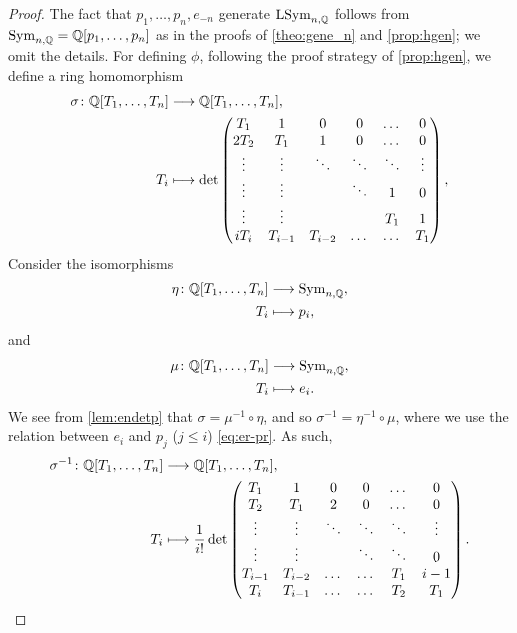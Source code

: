 \documentclass[11pt]{amsart}
\begin{document}
\begin{proof}
    The fact that \(p_1,\dots,p_n,e_{-n}\) generate \(\mathrm{LSym}_{n,\mathbb{Q}}\) follows from \(\mathrm{Sym}_{n,\mathbb{Q}} = \mathbb{Q}[p_1,\dots,p_n]\) as in the proofs of \cref{theo:gene_n} and \cref{prop:hgen}; we omit the details. For defining \(\phi\), following the proof strategy of \cref{prop:hgen}, we define a ring homomorphism
    \begin{align*}
        \sigma \colon \mathbb{Q} [T_1,\dots,T_n] &\longrightarrow \mathbb{Q}[T_1,\dots,T_n], \\
        T_i &\longmapsto \det\begin{pmatrix}
        T_1 & 1 & 0& 0 & \dots &0\\
        2T_2 & T_1 & 1 & 0& \dots & 0\\
        \vdots & \vdots & \ddots & \ddots &\ddots & \vdots \\
        \vdots &  \vdots &&\ddots & 1 & 0\\
        \vdots & \vdots &&&T_1 & 1\\
        iT_i & T_{i-1} & T_{i-2} &\dots &\dots& T_1\\
    \end{pmatrix},
    \end{align*}
    Consider the isomorphisms
    \begin{align*}
        \eta \colon \mathbb{Q}[T_1,\dots,T_n] &\longrightarrow \mathrm{Sym}_{n,\mathbb{Q}},\\
        T_i  &\longmapsto p_i,
    \end{align*}
    and
    \begin{align*}
        \mu \colon \mathbb{Q}[T_1,\dots,T_n] &\longrightarrow \mathrm{Sym}_{n,\mathbb{Q}},\\
        T_i  &\longmapsto e_i.
    \end{align*}
    We see from \cref{lem:endetp} that \(\sigma = \mu^{-1} \circ \eta\), and so \(\sigma^{-1} = \eta^{-1} \circ \mu\), where we use the relation between $e_i$ and $p_j$ ($j\leq i$) \cref{eq:er-pr}. As such,
    \begin{align*}
        \sigma^{-1} \colon \mathbb{Q} [T_1,\dots,T_n] &\longrightarrow \mathbb{Q}[T_1,\dots,T_n],\\
        T_i &\longmapsto \frac{1}{i!}\det\begin{pmatrix}
        T_1 & 1 & 0 & 0 & \dots & 0\\
        T_2 & T_1 & 2  & 0 & \dots & 0\\
        \vdots & \vdots & \ddots & \ddots & \ddots & \vdots\\
        \vdots & \vdots &  & \ddots & \ddots & 0 \\
        T_{i-1} & T_{i -2} & \dots & \dots & T_1 & i-1 \\
        T_i & T_{i - 1} & \dots & \dots & T_2 & T_1 \\
    \end{pmatrix}. 
    \end{align*}


\end{proof}
\end{document}
